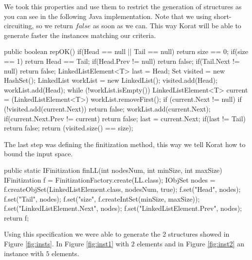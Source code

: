 \documentclass[10pt, conference, compsocconf]{IEEEtran}
\begin{document}
We took this properties and use them to restrict the generation of structures as you can see in the following Java implementation.
Note that we using short-circuiting, so we return $false$ as soon as we can. This way Korat will be able to generate faster the instances matching our criteria.

\begin{code}
public boolean repOK() {
  if(Head == null || Tail == null)
    return size == 0;
  if(size == 1) return Head == Tail;
  if(Head.Prev != null) return false;
  if(Tail.Next != null) return false;
  LinkedListElement<T> last = Head;
  Set visited = new HashSet();
  LinkedList workList = new LinkedList();
  visited.add(Head);
  workList.add(Head);
  while (!workList.isEmpty()) {
    LinkedListElement<T> current = (LinkedListElement<T>) workList.removeFirst();
    if (current.Next != null) {
      if (!visited.add(current.Next))
	    return false;
      workList.add(current.Next);
      if(current.Next.Prev != current) return false;
      last = current.Next;
    }
  }
  if(last != Tail)
    return false;
  return (visited.size() == size);
}
\end{code}

The last step was defining the finitization method, this way we tell Korat how to bound the input space.

\begin{code}
public static IFinitization finLL(int nodesNum, int minSize, int maxSize) {
  IFinitization f = FinitizationFactory.create(LL.class);
  IObjSet nodes = f.createObjSet(LinkedListElement.class, nodesNum, true);
  f.set("Head", nodes);
  f.set("Tail", nodes);
  f.set("size", f.createIntSet(minSize, maxSize));
  f.set("LinkedListElement.Next", nodes);
  f.set("LinkedListElement.Prev", nodes);
  return f;
}
\end{code}

Using this specification we were able to generate the 2 structures showed in Figure \ref{fig:insts}. In Figure \ref{fig:inst1} with $2$ elements
and in Figure \ref{fig:inst2} an instance with $5$ elements.
\end{document}
